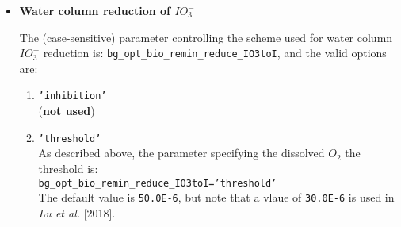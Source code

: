 \begin{itemize}[noitemsep]
\setlength{\itemindent}{.2in}

\vspace{2mm}
\item \textbf{Water column reduction of \(IO^{-}_{3}\)}

\vspace{1mm}
The (case-sensitive) parameter controlling the scheme used for water column \(IO^{-}_{3}\) reduction is: \texttt{bg\_opt\_bio\_remin\_reduce\_IO3toI}, and the valid options are:

\begin{enumerate}[noitemsep]

\vspace{1mm}
\item \texttt{'inhibition'}
\vspace{1mm}
\\(\textbf{not used})

\vspace{1mm}
\item \texttt{'threshold'}
\vspace{1mm}
\\As described above, the parameter specifying the dissolved \(O_{2}\) the threshold is: \\\texttt{bg\_opt\_bio\_remin\_reduce\_IO3toI='threshold'}
\vspace{1mm} 
\\The default value is \texttt{50.0E-6}, but note that a vlaue of \texttt{30.0E-6} is used in \textit{Lu et al.} [2018].


\end{enumerate}
\end{itemize}
